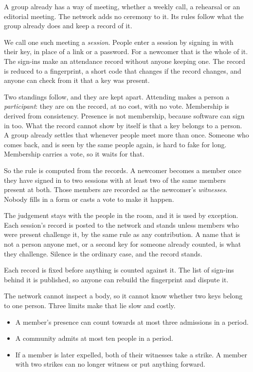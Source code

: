 \documentclass[11pt,a4paper]{article}
\begin{document}
A group already has a way of meeting, whether a weekly call, a rehearsal or an editorial meeting. The network adds no ceremony to it. Its rules follow what the group already does and keep a record of it.

We call one such meeting a \emph{session}. People enter a session by signing in with their key, in place of a link or a password. For a newcomer that is the whole of it. The sign-ins make an attendance record without anyone keeping one. The record is reduced to a fingerprint, a short code that changes if the record changes, and anyone can check from it that a key was present.

Two standings follow, and they are kept apart. Attending makes a person a \emph{participant}: they are on the record, at no cost, with no vote. Membership is derived from consistency. Presence is not membership, because software can sign in too. What the record cannot show by itself is that a key belongs to a person. A group already settles that whenever people meet more than once. Someone who comes back, and is seen by the same people again, is hard to fake for long. Membership carries a vote, so it waits for that.

So the rule is computed from the records. A newcomer becomes a member once they have signed in to two sessions with at least two of the same members present at both. Those members are recorded as the newcomer's \emph{witnesses}. Nobody fills in a form or casts a vote to make it happen.

The judgement stays with the people in the room, and it is used by exception. Each session's record is posted to the network and stands unless members who were present challenge it, by the same rule as any contribution. A name that is not a person anyone met, or a second key for someone already counted, is what they challenge. Silence is the ordinary case, and the record stands.

Each record is fixed before anything is counted against it. The list of sign-ins behind it is published, so anyone can rebuild the fingerprint and dispute it.

The network cannot inspect a body, so it cannot know whether two keys belong to one person. Three limits make that lie slow and costly.

\begin{itemize}
  \item A member's presence can count towards at most three admissions in a period.
  \item A community admits at most ten people in a period.
  \item If a member is later expelled, both of their witnesses take a strike. A member with two strikes can no longer witness or put anything forward.
\end{itemize}
\end{document}

